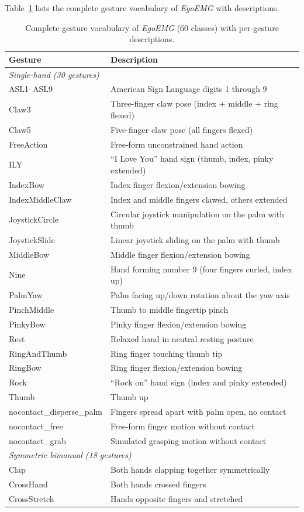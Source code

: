 \documentclass{article}
\newcommand{\dataset}{\textit{EgoEMG}}
\begin{document}
Table~\ref{tab:gesture_vocabulary} lists the complete gesture vocabulary of \dataset{} with descriptions.

\begin{table}[h]
\centering
\caption{Complete gesture vocabulary of \dataset{} (60 classes) with per-gesture descriptions.}
\label{tab:gesture_vocabulary}
\footnotesize
\begin{tabular}{@{}lp{}@{}}
\toprule
\textbf{Gesture} & \textbf{Description} \\
\midrule
\multicolumn{2}{l}{\textit{Single-hand (30 gestures)}} \\
\midrule
ASL1--ASL9 & American Sign Language digits 1 through 9 \\
Claw3 & Three-finger claw pose (index + middle + ring flexed) \\
Claw5 & Five-finger claw pose (all fingers flexed) \\
FreeAction & Free-form unconstrained hand action \\
ILY & ``I Love You'' hand sign (thumb, index, pinky extended) \\
IndexBow & Index finger flexion/extension bowing \\
IndexMiddleClaw & Index and middle fingers clawed, others extended \\
JoystickCircle & Circular joystick manipulation on the palm with thumb \\
JoystickSlide & Linear joystick sliding on the palm with thumb \\
MiddleBow & Middle finger flexion/extension bowing \\
Nine & Hand forming number 9 (four fingers curled, index up) \\
PalmYaw & Palm facing up/down rotation about the yaw axis \\
PinchMiddle & Thumb to middle fingertip pinch \\
PinkyBow & Pinky finger flexion/extension bowing \\
Rest & Relaxed hand in neutral resting posture \\
RingAndThumb & Ring finger touching thumb tip \\
RingBow & Ring finger flexion/extension bowing \\
Rock & ``Rock on'' hand sign (index and pinky extended) \\
Thumb & Thumb up \\
nocontact\_disperse\_palm & Fingers spread apart with palm open, no contact \\
nocontact\_free & Free-form finger motion without contact \\
nocontact\_grab & Simulated grasping motion without contact\\
\midrule
\multicolumn{2}{l}{\textit{Symmetric bimanual (18 gestures)}} \\
\midrule
Clap & Both hands clapping together symmetrically \\
CrossHand & Both hands crossed fingers \\
CrossStretch & Hands opposite fingers and stretched \\


\end{tabular}
\end{table}
\end{document}
